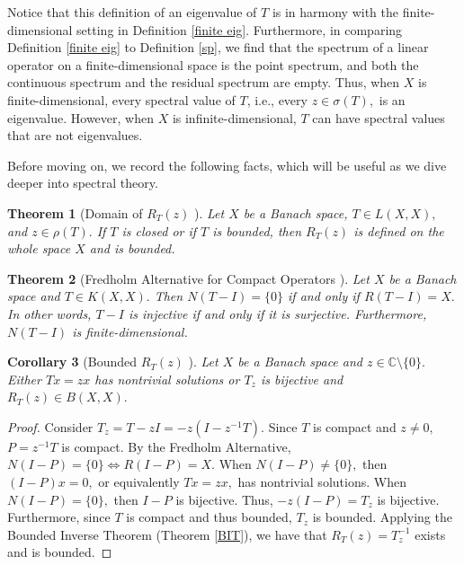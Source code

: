 \documentclass[12pt,a4paper]{article}
\theoremstyle{boldthm}
\newtheorem{theorem}{Theorem}[section]
\newtheorem{corollary}[theorem]{Corollary}
\theoremstyle{bolddefn}
\begin{document}
Notice that this definition of an eigenvalue of $T$ is in harmony with the finite-dimensional setting in Definition \ref{finite eig}. Furthermore, in comparing Definition \ref{finite eig} to Definition \ref{sp}, we find that the spectrum of a linear operator on a finite-dimensional space is the point spectrum, and both the continuous spectrum and the residual spectrum are empty. Thus, when $X$ is finite-dimensional, every spectral value of $T$, i.e., every $z \in \sigma(T),$ is an eigenvalue. However, when $X$ is infinite-dimensional, $T$ can have spectral values that are not eigenvalues. 

Before moving on, we record the following facts, which will be useful as we dive deeper into spectral theory.

\begin{theorem} [{Domain of $R_T(z)$ \cite[7.2-3]{krey}}] 
    Let $X$ be a Banach space, $T \in L(X, X),$ and $z \in \rho(T).$ If $T$ is closed or if $T$ is bounded, then $R_T(z)$ is defined on the whole space $X$ and is bounded.
\end{theorem}
    
    
    
    
    
    
    

\begin{theorem}[Fredholm Alternative for Compact Operators \cite{umberto}] \label{FA}
Let $X$ be a Banach space and $T \in K(X, X).$ Then $N(T-I) = \{0\}$ if and only if $R(T-I) = X.$ In other words, $T-I$ is injective if and only if it is surjective. Furthermore, $N(T-I)$ is finite-dimensional.
\end{theorem}

\begin{corollary}[Bounded $R_T(z)$ \cite{umberto}]
    Let $X$ be a Banach space and $z \in \mathbb{C} \setminus \{0\}.$ Either $Tx = zx$ has nontrivial solutions or $T_z$ is bijective and $R_T(z) \in B(X, X).$ 
\end{corollary}
\begin{proof}
   Consider $T_z = T - zI = - z ( I - z^{-1} T).$ Since $T$ is compact and $z \ne 0,$ $P = z^{-1} T$ is compact. By the Fredholm Alternative, $N(I - P) = \{0\} \iff R(I - P) = X.$ When $N(I-P) \ne \{0\},$ then $(I-P)x = 0,$ or equivalently $T x = z x,$ has nontrivial solutions. When $N(I-P) = \{0\},$ then $I-P$ is bijective. Thus, $-z(I-P) = T_z$ is bijective. Furthermore, since $T$ is compact and thus bounded, $T_z$ is bounded. Applying the Bounded Inverse Theorem (Theorem \ref{BIT}), we have that $R_T(z) = T_z^{-1}$ exists and is bounded.
\end{proof}
\end{document}
